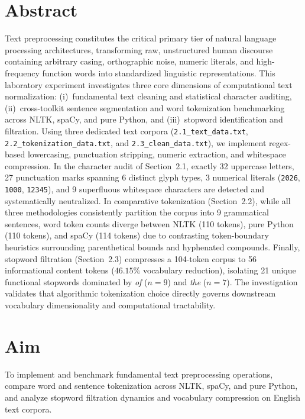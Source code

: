 \documentclass[12pt,a4paper]{report}
\begin{document}
\section{Abstract}
Text preprocessing constitutes the critical primary tier of natural language processing architectures, transforming raw, unstructured human discourse containing arbitrary casing, orthographic noise, numeric literals, and high-frequency function words into standardized linguistic representations. This laboratory experiment investigates three core dimensions of computational text normalization: (i)~fundamental text cleaning and statistical character auditing, (ii)~cross-toolkit sentence segmentation and word tokenization benchmarking across NLTK, spaCy, and pure Python, and (iii)~stopword identification and filtration. Using three dedicated text corpora (\texttt{2.1\_text\_data.txt}, \texttt{2.2\_tokenization\_data.txt}, and \texttt{2.3\_clean\_data.txt}), we implement regex-based lowercasing, punctuation stripping, numeric extraction, and whitespace compression. In the character audit of Section~2.1, exactly 32 uppercase letters, 27 punctuation marks spanning 6 distinct glyph types, 3 numerical literals (\texttt{2026}, \texttt{1000}, \texttt{12345}), and 9 superfluous whitespace characters are detected and systematically neutralized. In comparative tokenization (Section~2.2), while all three methodologies consistently partition the corpus into 9 grammatical sentences, word token counts diverge between NLTK (110 tokens), pure Python (110 tokens), and spaCy (114 tokens) due to contrasting token-boundary heuristics surrounding parenthetical bounds and hyphenated compounds. Finally, stopword filtration (Section~2.3) compresses a 104-token corpus to 56 informational content tokens ($46.15\%$ vocabulary reduction), isolating 21 unique functional stopwords dominated by \textit{of} ($n=9$) and \textit{the} ($n=7$). The investigation validates that algorithmic tokenization choice directly governs downstream vocabulary dimensionality and computational tractability.

\section{Aim}
To implement and benchmark fundamental text preprocessing operations, compare word and sentence tokenization across NLTK, spaCy, and pure Python, and analyze stopword filtration dynamics and vocabulary compression on English text corpora.
\end{document}
